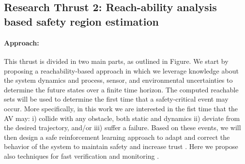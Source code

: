 
\subsection{Research Thrust 2: Reach-ability analysis based safety region estimation}
\label{sec:reachability}




\paragraph{Approach:} 
 This thrust is divided in two main parts, as outlined in Figure. We start by proposing a reachability-based approach in which we leverage knowledge about the system dynamics and process, sensor, and environmental uncertainties to determine the future states over a finite time horizon. The computed reachable sets will be used to determine the first time that a safety-critical event may occur. 
More specifically, in this work we are interested in the fist time that the AV may: i) collide with any obstacle, both static and dynamics ii) deviate from the desired trajectory, and/or iii) suffer a failure. Based on these events, we will then design a safe reinforcement learning approach to adapt and correct the behavior of the system to maintain safety and increase trust . Here we propose also techniques for fast verification and monitoring .

%


